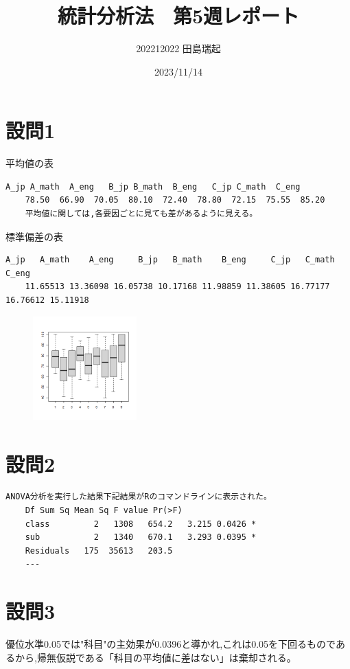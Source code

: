 \documentclass[fontsize = 10pt, paper= a4,twocolumn,column_gap=5zw]{jlreq}
\begin{document}
\title{統計分析法　第5週レポート}
\author{202212022 田島瑞起}
\date{2023/11/14}
\maketitle
\section{設問1}
平均値の表
\begin{lstlisting}[basicstyle=\ttfamily\footnotesize, frame=single, caption=s2212022-1.c ,label=s2212022-1.c]
    A_jp A_math  A_eng   B_jp B_math  B_eng   C_jp C_math  C_eng 
    78.50  66.90  70.05  80.10  72.40  78.80  72.15  75.55  85.20 
    平均値に関しては,各要因ごとに見ても差があるように見える。
    \end{lstlisting}
標準偏差の表
\begin{lstlisting}[basicstyle=\ttfamily\footnotesize, frame=single, caption=s2212022-1.c ,label=s2212022-1.c]
    A_jp   A_math    A_eng     B_jp   B_math    B_eng     C_jp   C_math  C_eng 
    11.65513 13.36098 16.05738 10.17168 11.98859 11.38605 16.77177 16.76612 15.11918 
    \end{lstlisting}
    \begin{figure}
        \centering
        \includegraphics[width=4cm]{5-1.png}
    \end{figure}
\section{設問2}
\begin{lstlisting}[basicstyle=\ttfamily\footnotesize, frame=single, caption=s2212022-1.c ,label=s2212022-1.c]
    ANOVA分析を実行した結果下記結果がRのコマンドラインに表示された。
    Df Sum Sq Mean Sq F value Pr(>F)  
    class         2   1308   654.2   3.215 0.0426 *
    sub           2   1340   670.1   3.293 0.0395 *
    Residuals   175  35613   203.5                 
    ---
    \end{lstlisting}
\section{設問3}
優位水準0.05では"科目"の主効果が0.0396と導かれ,これは0.05を下回るものであるから,帰無仮説である「科目の平均値に差はない」は棄却される。
\end{document}
